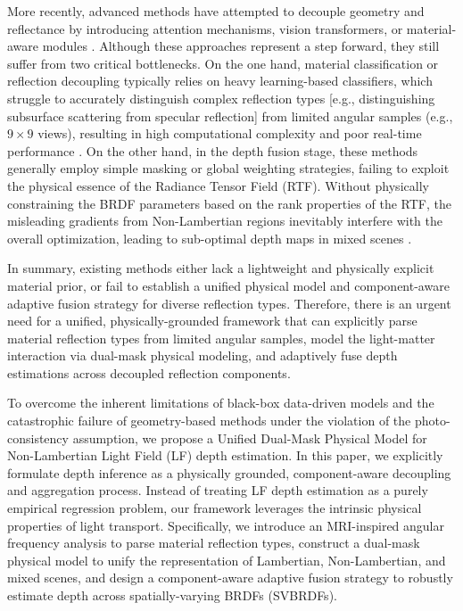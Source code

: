 More recently, advanced methods have attempted to decouple geometry and reflectance by introducing attention mechanisms, vision transformers, or material-aware modules \cite{attentionmechanismsmaterial}. Although these approaches represent a step forward, they still suffer from two critical bottlenecks. On the one hand, material classification or reflection decoupling typically relies on heavy learning-based classifiers, which struggle to accurately distinguish complex reflection types  [e.g., distinguishing subsurface scattering from specular reflection] from limited angular samples (e.g., $9 \times 9$ views), resulting in high computational complexity and poor real-time performance \cite{heavylearningbasedclassifie}. On the other hand, in the depth fusion stage, these methods generally employ simple masking or global weighting strategies, failing to exploit the physical essence of the Radiance Tensor Field (RTF). Without physically constraining the BRDF parameters based on the rank properties of the RTF, the misleading gradients from Non-Lambertian regions inevitably interfere with the overall optimization, leading to sub-optimal depth maps in mixed scenes \cite{misleadinggradientssuboptim}.

In summary, existing methods either lack a lightweight and physically explicit material prior, or fail to establish a unified physical model and component-aware adaptive fusion strategy for diverse reflection types. Therefore, there is an urgent need for a unified, physically-grounded framework that can explicitly parse material reflection types from limited angular samples, model the light-matter interaction via dual-mask physical modeling, and adaptively fuse depth estimations across decoupled reflection components.

To overcome the inherent limitations of black-box data-driven models and the catastrophic failure of geometry-based methods under the violation of the photo-consistency assumption, we propose a Unified Dual-Mask Physical Model for Non-Lambertian Light Field (LF) depth estimation. In this paper, we explicitly formulate depth inference as a physically grounded, component-aware decoupling and aggregation process. Instead of treating LF depth estimation as a purely empirical regression problem, our framework leverages the intrinsic physical properties of light transport. Specifically, we introduce an MRI-inspired angular frequency analysis to parse material reflection types, construct a dual-mask physical model to unify the representation of Lambertian, Non-Lambertian, and mixed scenes, and design a component-aware adaptive fusion strategy to robustly estimate depth across spatially-varying BRDFs (SVBRDFs).

